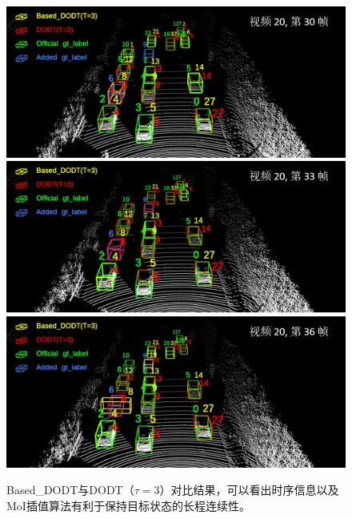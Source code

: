 \begin{figure}[t]
	\centering
	\includegraphics[width=\textwidth]{./imgs/viz_results/val/dodt_based_01.png}\vspace{1pt}
	\includegraphics[width=\textwidth]{./imgs/viz_results/val/dodt_based_02.png}\vspace{1pt}
	\includegraphics[width=\textwidth]{./imgs/viz_results/val/dodt_based_03.png}
	\caption{Based\_DODT与DODT（$\tau=3$）对比结果，可以看出时序信息以及MoI插值算法有利于保持目标状态的长程连续性。}
	\label{fig:dodt_based}
\end{figure}
